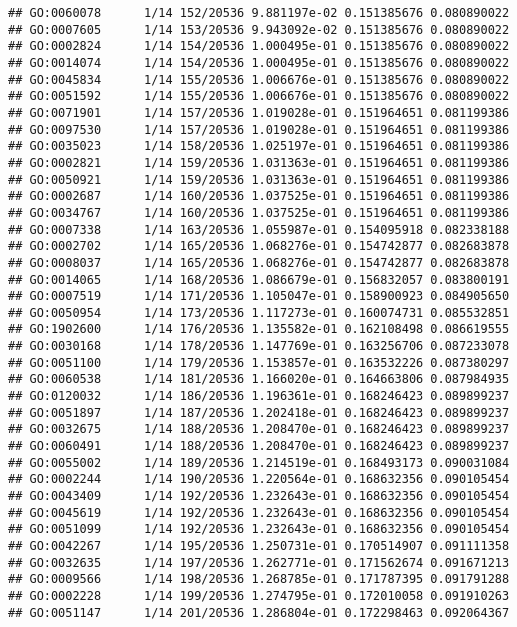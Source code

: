 \documentclass[
]{article}
\begin{document}
\begin{verbatim}
## GO:0060078      1/14 152/20536 9.881197e-02 0.151385676 0.080890022
## GO:0007605      1/14 153/20536 9.943092e-02 0.151385676 0.080890022
## GO:0002824      1/14 154/20536 1.000495e-01 0.151385676 0.080890022
## GO:0014074      1/14 154/20536 1.000495e-01 0.151385676 0.080890022
## GO:0045834      1/14 155/20536 1.006676e-01 0.151385676 0.080890022
## GO:0051592      1/14 155/20536 1.006676e-01 0.151385676 0.080890022
## GO:0071901      1/14 157/20536 1.019028e-01 0.151964651 0.081199386
## GO:0097530      1/14 157/20536 1.019028e-01 0.151964651 0.081199386
## GO:0035023      1/14 158/20536 1.025197e-01 0.151964651 0.081199386
## GO:0002821      1/14 159/20536 1.031363e-01 0.151964651 0.081199386
## GO:0050921      1/14 159/20536 1.031363e-01 0.151964651 0.081199386
## GO:0002687      1/14 160/20536 1.037525e-01 0.151964651 0.081199386
## GO:0034767      1/14 160/20536 1.037525e-01 0.151964651 0.081199386
## GO:0007338      1/14 163/20536 1.055987e-01 0.154095918 0.082338188
## GO:0002702      1/14 165/20536 1.068276e-01 0.154742877 0.082683878
## GO:0008037      1/14 165/20536 1.068276e-01 0.154742877 0.082683878
## GO:0014065      1/14 168/20536 1.086679e-01 0.156832057 0.083800191
## GO:0007519      1/14 171/20536 1.105047e-01 0.158900923 0.084905650
## GO:0050954      1/14 173/20536 1.117273e-01 0.160074731 0.085532851
## GO:1902600      1/14 176/20536 1.135582e-01 0.162108498 0.086619555
## GO:0030168      1/14 178/20536 1.147769e-01 0.163256706 0.087233078
## GO:0051100      1/14 179/20536 1.153857e-01 0.163532226 0.087380297
## GO:0060538      1/14 181/20536 1.166020e-01 0.164663806 0.087984935
## GO:0120032      1/14 186/20536 1.196361e-01 0.168246423 0.089899237
## GO:0051897      1/14 187/20536 1.202418e-01 0.168246423 0.089899237
## GO:0032675      1/14 188/20536 1.208470e-01 0.168246423 0.089899237
## GO:0060491      1/14 188/20536 1.208470e-01 0.168246423 0.089899237
## GO:0055002      1/14 189/20536 1.214519e-01 0.168493173 0.090031084
## GO:0002244      1/14 190/20536 1.220564e-01 0.168632356 0.090105454
## GO:0043409      1/14 192/20536 1.232643e-01 0.168632356 0.090105454
## GO:0045619      1/14 192/20536 1.232643e-01 0.168632356 0.090105454
## GO:0051099      1/14 192/20536 1.232643e-01 0.168632356 0.090105454
## GO:0042267      1/14 195/20536 1.250731e-01 0.170514907 0.091111358
## GO:0032635      1/14 197/20536 1.262771e-01 0.171562674 0.091671213
## GO:0009566      1/14 198/20536 1.268785e-01 0.171787395 0.091791288
## GO:0002228      1/14 199/20536 1.274795e-01 0.172010058 0.091910263
## GO:0051147      1/14 201/20536 1.286804e-01 0.172298463 0.092064367

\end{verbatim}
\end{document}
